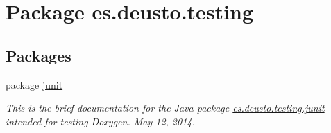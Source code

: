 \hypertarget{namespacees_1_1deusto_1_1testing}{}\section{Package es.\+deusto.\+testing}
\label{namespacees_1_1deusto_1_1testing}
\subsection*{Packages}
\begin{DoxyCompactItemize}
\item 
package \mbox{\hyperlink{namespacees_1_1deusto_1_1testing_1_1junit}{junit}}
\begin{DoxyCompactList}\small\item\em This is the brief documentation for the Java package \mbox{\hyperlink{namespacees_1_1deusto_1_1testing_1_1junit}{es.\+deusto.\+testing.\+junit}} intended for testing Doxygen. May 12, 2014. \end{DoxyCompactList}\end{DoxyCompactItemize}
